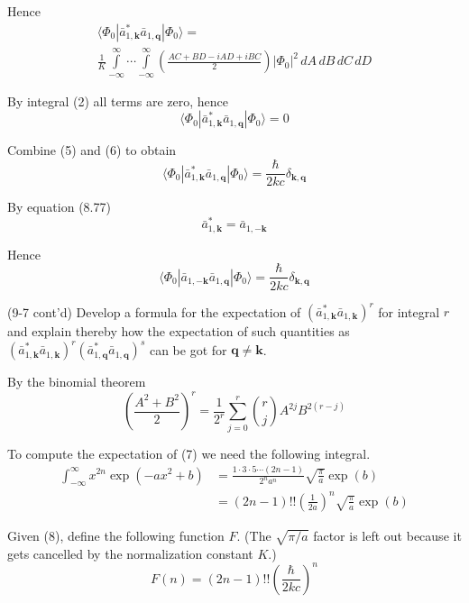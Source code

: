 \documentclass[12pt]{article}
\newcommand\U{\vert\Phi_0\vert^2}
\begin{document}
Hence
\begin{multline*}
\langle\Phi_0|\bar a_{1,\mathbf k}^*\bar a_{1,\mathbf q}|\Phi_0\rangle=
\\
\frac{1}{K}\int\limits_{-\infty}^\infty\cdots\int\limits_{-\infty}^\infty
\left(\frac{AC+BD-iAD+iBC}{2}\right)
\U\,dA\,dB\,dC\,dD
\end{multline*}

By integral (2) all terms are zero, hence
\begin{equation*}
\langle\Phi_0|\bar a_{1,\mathbf k}^*\bar a_{1,\mathbf q}|\Phi_0\rangle=0
\tag{6}
\end{equation*}

Combine (5) and (6) to obtain
\begin{equation*}
\langle\Phi_0|\bar a_{1,\mathbf k}^*\bar a_{1,\mathbf q}|\Phi_0\rangle=\frac{\hbar}{2kc}\delta_{\mathbf k,\mathbf q}
\end{equation*}

By equation (8.77)
\begin{equation*}
\bar a_{1,\mathbf k}^*=\bar a_{1,-\mathbf k}
\end{equation*}

Hence
\begin{equation*}
\langle\Phi_0|\bar a_{1,-\mathbf k}\bar a_{1,\mathbf q}|\Phi_0\rangle=\frac{\hbar}{2kc}\delta_{\mathbf k,\mathbf q}
\end{equation*}

(9-7 cont'd)
Develop a formula for the expectation of
$(\bar a_{1,\mathbf k}^*\bar a_{1,\mathbf k})^r$
for integral $r$ and explain thereby how the expectation of such
quantities as
$(\bar a_{1,\mathbf k}^*\bar a_{1,\mathbf k})^r
(\bar a_{1,\mathbf q}^*\bar a_{1,\mathbf q})^s$
can be got for $\mathbf q\ne\mathbf k$.

\bigskip
By the binomial theorem
\begin{equation*}
\left(\frac{A^2+B^2}{2}\right)^r=\frac{1}{2^r}\sum_{j=0}^r\binom{r}{j}A^{2j}B^{2(r-j)}
\tag{7}
\end{equation*}

To compute the expectation of (7) we need the following integral.
\begin{align*}
\int_{-\infty}^\infty x^{2n}\exp(-ax^2+b)
&=\frac{1\cdot3\cdot5\cdots(2n-1)}{2^na^n}\sqrt{\frac{\pi}{a}}\exp(b)
\\
&=(2n-1)!!
\left(\frac{1}{2a}\right)^n
\sqrt{\frac{\pi}{a}}\exp(b)
\tag{8}
\end{align*}

Given (8), define the following function $F$.
(The $\sqrt{\pi/a}$ factor is left out because it gets cancelled by the normalization constant $K$.)
\begin{equation*}
F(n)=(2n-1)!!\left(\frac{\hbar}{2kc}\right)^n
\end{equation*}
\end{document}
